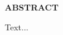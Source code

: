  \setcounter{page}{2}
\begin{center}
{\Large{\bf{ABSTRACT}}}
\end{center}

\noindent

Text...

\clearpage
